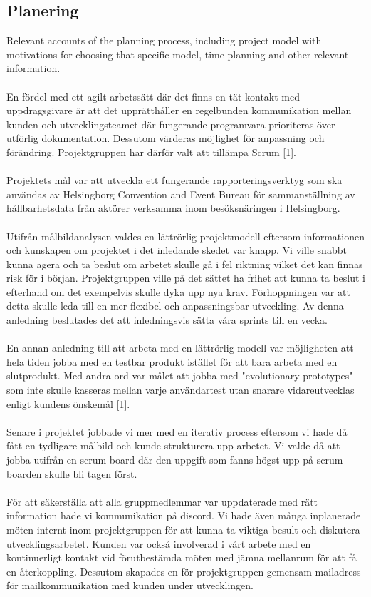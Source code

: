 \documentclass[12pt]{article}
\begin{document}
\subsection{Planering}
Relevant accounts of the planning process, including project model with motivations for choosing that specific model, time planning and other relevant information.\\\\
En fördel med ett agilt arbetssätt där det finns en tät kontakt med uppdragsgivare är att det upprätthåller en regelbunden kommunikation mellan kunden och utvecklingsteamet där fungerande programvara prioriteras över utförlig dokumentation. Dessutom värderas möjlighet för anpassning och förändring. Projektgruppen har därför valt att tillämpa Scrum [1].  \\\\
Projektets mål var att utveckla ett fungerande rapporteringsverktyg som ska användas av Helsingborg Convention and Event Bureau för sammanställning av \\ hållbarhetsdata från aktörer verksamma inom besöksnäringen i Helsingborg. \\\\
Utifrån målbildanalysen valdes en lättrörlig projektmodell eftersom informationen och kunskapen om projektet i det inledande skedet var knapp. Vi ville snabbt kunna agera och ta beslut om arbetet skulle gå i fel riktning vilket det kan finnas risk för i början. Projektgruppen ville på det sättet ha frihet att kunna ta beslut i efterhand om det exempelvis skulle dyka upp nya krav. Förhoppningen var att detta skulle leda till en mer flexibel och anpassningsbar utveckling. Av denna anledning beslutades det att inledningsvis sätta våra sprints till en vecka. \\\\ 
En annan anledning till att arbeta med en lättrörlig modell var möjligheten att hela tiden jobba med en testbar produkt istället för att bara arbeta med en slutprodukt. Med andra ord var målet att jobba med "evolutionary prototypes" som inte skulle kasseras mellan varje användartest utan snarare vidareutvecklas enligt kundens önskemål [1].\\\\
Senare i projektet jobbade vi mer med en iterativ process eftersom vi hade då fått en tydligare målbild och kunde strukturera upp arbetet. Vi valde då att jobba utifrån en scrum board där den uppgift som fanns högst upp på scrum boarden skulle bli tagen först. \\\\
För att säkerställa att alla gruppmedlemmar var uppdaterade med rätt information hade vi kommunikation på discord. Vi hade även många inplanerade möten internt inom projektgruppen för att kunna ta viktiga besult och diskutera utvecklingsarbetet. Kunden var också involverad i vårt arbete med en kontinuerligt kontakt vid förutbestämda möten med jämna mellanrum för att få en återkoppling. Dessutom skapades en för projektgruppen gemensam mailadress för mailkommunikation med kunden under utvecklingen.
\end{document}
